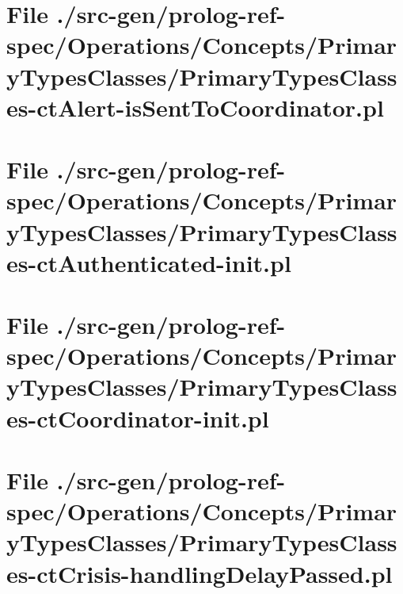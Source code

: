 \section[File /src-gen.../PrimaryTypesClasses-ctAlert-isSentToCoordinator.pl]{File ./src-gen/prolog-ref-spec/Operations/Concepts/PrimaryTypesClasses/PrimaryTypesClasses-ctAlert-isSentToCoordinator.pl}
\scriptsize

\normalsize
	
\section[File /src-gen/prolog-ref-spec.../PrimaryTypesClasses-ctAuthenticated-init.pl]{File ./src-gen/prolog-ref-spec/Operations/Concepts/PrimaryTypesClasses/PrimaryTypesClasses-ctAuthenticated-init.pl}
\scriptsize

\normalsize
	
\section[File /src-gen/prolog-ref-spec.../PrimaryTypesClasses-ctCoordinator-init.pl]{File ./src-gen/prolog-ref-spec/Operations/Concepts/PrimaryTypesClasses/PrimaryTypesClasses-ctCoordinator-init.pl}
\scriptsize

\normalsize
	
\section[File /src-gen.../PrimaryTypesClasses-ctCrisis-handlingDelayPassed.pl]{File ./src-gen/prolog-ref-spec/Operations/Concepts/PrimaryTypesClasses/PrimaryTypesClasses-ctCrisis-handlingDelayPassed.pl}
\scriptsize

\normalsize
	
